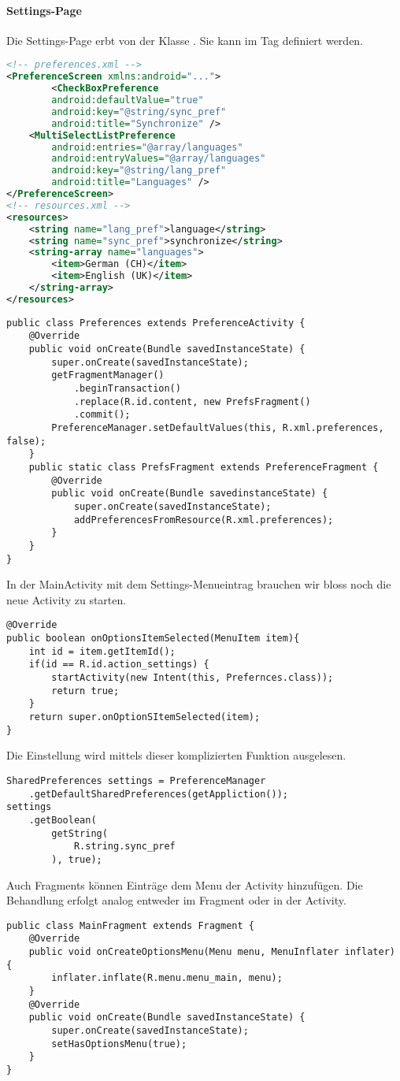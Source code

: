 \paragraph{Settings-Page} Die Settings-Page erbt von der Klasse . Sie kann im  Tag definiert werden.
\begin{lstlisting}[language=xml]
<!-- preferences.xml -->
<PreferenceScreen xmlns:android="...">
        <CheckBoxPreference
        android:defaultValue="true"
        android:key="@string/sync_pref"
        android:title="Synchronize" />
    <MultiSelectListPreference
        android:entries="@array/languages"
        android:entryValues="@array/languages"
        android:key="@string/lang_pref"
        android:title="Languages" />
</PreferenceScreen>
<!-- resources.xml -->
<resources>
    <string name="lang_pref">language</string>
    <string name="sync_pref">synchronize</string>
    <string-array name="languages">
        <item>German (CH)</item>
        <item>English (UK)</item>
    </string-array>
</resources>
\end{lstlisting}
\begin{lstlisting}
public class Preferences extends PreferenceActivity {
    @Override
    public void onCreate(Bundle savedInstanceState) {
        super.onCreate(savedInstanceState);
        getFragmentManager()
            .beginTransaction()
            .replace(R.id.content, new PrefsFragment()
            .commit();
        PreferenceManager.setDefaultValues(this, R.xml.preferences, false);
    }
    public static class PrefsFragment extends PreferenceFragment {
        @Override
        public void onCreate(Bundle savedinstanceState) {
            super.onCreate(savedInstanceState);
            addPreferencesFromResource(R.xml.preferences);
        }
    }
}
\end{lstlisting}
In der MainActivity mit dem Settings-Menueintrag brauchen wir bloss noch die neue Activity zu starten.
\begin{lstlisting}
@Override
public boolean onOptionsItemSelected(MenuItem item){
    int id = item.getItemId();
    if(id == R.id.action_settings) {
        startActivity(new Intent(this, Prefernces.class));
        return true;
    }
    return super.onOptionSItemSelected(item);
}
\end{lstlisting}
Die Einstellung wird mittels dieser komplizierten Funktion ausgelesen.
\begin{lstlisting}
SharedPreferences settings = PreferenceManager
    .getDefaultSharedPreferences(getAppliction());
settings
    .getBoolean(
        getString(
            R.string.sync_pref
        ), true);
\end{lstlisting}
Auch Fragments können Einträge dem Menu der Activity hinzufügen. Die Behandlung erfolgt analog entweder im Fragment oder in der Activity.
\begin{lstlisting}
public class MainFragment extends Fragment {
    @Override
    public void onCreateOptionsMenu(Menu menu, MenuInflater inflater) {
        inflater.inflate(R.menu.menu_main, menu);
    }
    @Override
    public void onCreate(Bundle savedInstanceState) {
        super.onCreate(savedInstanceState);
        setHasOptionsMenu(true);
    }
}
\end{lstlisting}
